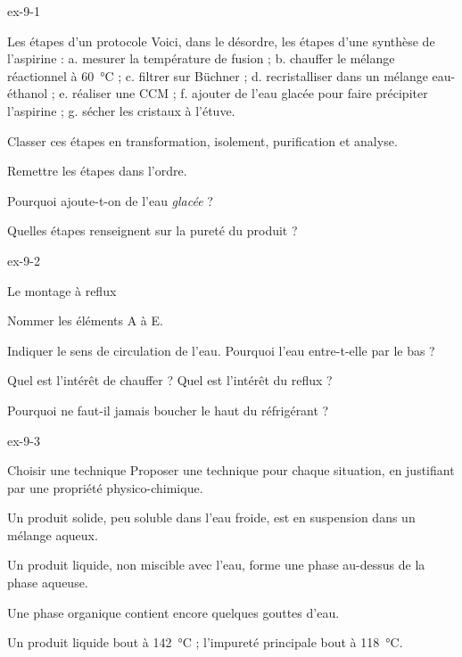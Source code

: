 \begin{blocLivre}{ex-9-1}
\begin{exercice}[1]{Les étapes d'un protocole}
Voici, dans le désordre, les étapes d'une synthèse de l'aspirine :
a. mesurer la température de fusion ; b. chauffer le mélange réactionnel à \qty{60}{\degreeCelsius} ; c. filtrer sur Büchner ;
d. recristalliser dans un mélange eau-éthanol ; e. réaliser une CCM ; f. ajouter de l'eau glacée pour faire précipiter
l'aspirine ; g. sécher les cristaux à l'étuve.
\begin{questions}
\item Classer ces étapes en transformation, isolement, purification et analyse.
\item Remettre les étapes dans l'ordre.
\item Pourquoi ajoute-t-on de l'eau \emph{glacée} ?
\item Quelles étapes renseignent sur la pureté du produit ?
\end{questions}
\end{exercice}
\end{blocLivre}
\begin{blocLivre}{ex-9-2}
\begin{exercice}[1]{Le montage à reflux}
\begin{questions}
\item Nommer les éléments A à E.
\item Indiquer le sens de circulation de l'eau. Pourquoi l'eau entre-t-elle par le bas ?
\item Quel est l'intérêt de chauffer ? Quel est l'intérêt du reflux ?
\item Pourquoi ne faut-il jamais boucher le haut du réfrigérant ?
\end{questions}
\end{exercice}
\end{blocLivre}
\begin{blocLivre}{ex-9-3}
\begin{exercice}[1]{Choisir une technique}
Proposer une technique pour chaque situation, en justifiant par une propriété physico-chimique.
\begin{questions}
\item Un produit solide, peu soluble dans l'eau froide, est en suspension dans un mélange aqueux.
\item Un produit liquide, non miscible avec l'eau, forme une phase au-dessus de la phase aqueuse.
\item Une phase organique contient encore quelques gouttes d'eau.
\item Un produit liquide bout à \qty{142}{\degreeCelsius} ; l'impureté principale bout à \qty{118}{\degreeCelsius}.
\end{questions}
\end{exercice}
\end{blocLivre}
